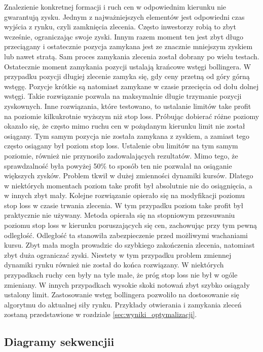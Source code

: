\documentclass[pdflatex,11pt]{aghdpl}
\begin{document}
Znalezienie konkretnej formacji i ruch cen w odpowiednim kierunku nie gwarantują zysku. Jednym z najważniejszych elementów jest odpowiedni czas wyjścia z rynku, czyli zamknięcia zlecenia. Często inwestorzy robią to zbyt wcześnie, ograniczając swoje zyski. Innym razem moment ten jest zbyt długo przeciągany i ostatecznie pozycja zamykana jest ze znacznie mniejszym zyskiem lub nawet stratą. Sam proces zamykania zlecenia został dobrany po wielu testach. Ostatecznie moment zamykania pozycji ustalają krańcowe wstęgi bollingera. W przypadku pozycji długiej zlecenie zamyka się, gdy ceny przetną od góry górną wstęgę. Pozycje krótkie są natomiast zamykane w czasie przecięcia od dołu dolnej wstęgi. Takie rozwiązanie pozwala na maksymalnie długie trzymanie pozycji zyskownych. Inne rozwiązania, które testowano, to ustalanie limitów take profit na poziomie kilkukrotnie wyższym niż stop loss. Próbując dobierać różne poziomy okazało się, że często mimo ruchu cen w pożądanym kierunku limit nie został osiągany. Tym samym pozycja nie została zamykana z zyskiem, a zamiast tego często osiągany był poziom stop loss. Ustalenie obu limitów na tym samym poziomie, również nie przynosiło zadowalających rezultatów. Mimo tego, że sprawdzalność była powyżej 50\% to sposób ten nie pozwalał na osiąganie większych zysków. Problem tkwił w dużej zmienności dynamiki kursów. Dlatego w niektórych momentach poziom take profit był absolutnie nie do osiągnięcia, a w innych zbyt mały. Kolejne rozwiązanie opierało się na modyfikacji poziomu stop loss w czasie trwania zlecenia. W tym przypadku poziom take profit był praktycznie nie używany. Metoda opierała się na stopniowym przesuwaniu poziomu stop loss w kierunku poruszających się cen, zachowując przy tym pewną odległość. Odległość ta stanowiła zabezpieczenie przed możliwymi wachaniami kursu. Zbyt mała mogła prowadzic do szybkiego zakończenia zlecenia, natomiast zbyt duża ograniczać zyski. Niestety w tym przypadku problem zmiennej dynamiki rynku również nie został do końca rozwiązany. W niektórych przypadkach ruchy cen były na tyle małe, że próg stop loss nie był w ogóle zmieniany. W innych przypadkach wysokie skoki notowań zbyt szybko osiągały ustalony limit. Zastosowanie wstęg bollingera pozwoliło na dostosowanie się algorytmu do aktualnej siły rynku. Przykłady otwierania i zamykania zleceń zostaną przedstawione w rozdziale \ref{sec:wyniki_optymalizacji}.
\subsection{Diagramy sekwencjii}
\end{document}
